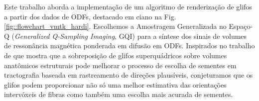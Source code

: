 \documentclass[
    12pt,                %
    oneside,            %
    a4paper,            %
    english,            %
    french,                %
    spanish,            %
    brazil                %
    ]{abntex2}
\begin{document}




Este trabalho aborda a implementação de um algoritmo de renderização de glifos a partir dos dados de ODFs, destacado em ciano na Fig. \ref{fig::flowchart_vmtk_hardi}. Escolhemos a Amostragem Generalizada no Espaço-Q (\textit{Generalized Q-Sampling Imaging}, GQI) para a síntese dos sinais de volumes de ressonância magnética ponderada em difusão em ODFs. 
Inspirados no trabalho de  que mostra que a sobreposição de glifos superquádricos sobre volumes anatômicos estruturais pode melhorar o processo de escolha de sementes em tractografia baseada em rastreamento de direções plausíveis, conjeturamos que os glifos podem proporcionar não só uma melhor estimativa das orientações intervóxeis de fibras como também uma escolha mais acurada de sementes.

\end{document}
